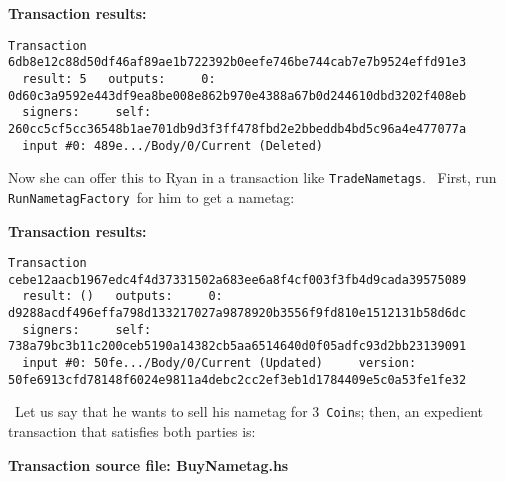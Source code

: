 \documentclass[11pt]{article}
\newcommand{\codeblock}[1]{\begin{mdframed}[
    backgroundcolor=header-color,
    linecolor=header-color,
    innertopmargin=10pt,
    ]{\texttt{#1}}\end{mdframed}}
\begin{document}
\textbf{Transaction results:}

\codeblock{Transaction 6db8e12c88d50df46af89ae1b722392b0eefe746be744cab7e7b9524effd91e3\newline
  result: 5\newline
  outputs:\newline
    0: 0d60c3a9592e443df9ea8be008e862b970e4388a67b0d244610dbd3202f408eb\newline
  signers:\newline
    self: 260cc5cf5cc36548b1ae701db9d3f3ff478fbd2e2bbeddb4bd5c96a4e477077a\newline
  input \#0: 489e...\slash{}Body\slash{}0\slash{}Current (Deleted)}

Now she can offer this to Ryan in a transaction like \texttt{TradeNametags}.  First, run \texttt{RunNametagFactory} for him to get a nametag:


\vspace{11pt}

\textbf{Transaction results:}

\codeblock{Transaction cebe12aacb1967edc4f4d37331502a683ee6a8f4cf003f3fb4d9cada39575089\newline
  result: ()\newline
  outputs:\newline
    0: d9288acdf496effa798d133217027a9878920b3556f9fd810e1512131b58d6dc\newline
  signers:\newline
    self: 738a79bc3b11c200ceb5190a14382cb5aa6514640d0f05adfc93d2bb23139091\newline
  input \#0: 50fe...\slash{}Body\slash{}0\slash{}Current (Updated)\newline
    version: 50fe6913cfd78148f6024e9811a4debc2cc2ef3eb1d1784409e5c0a53fe1fe32}

 Let us say that he wants to sell his nametag for 3 \texttt{Coin}s; then, an expedient transaction that satisfies both parties is:


\vspace{11pt}

\textbf{Transaction source file: BuyNametag.hs}
\end{document}
